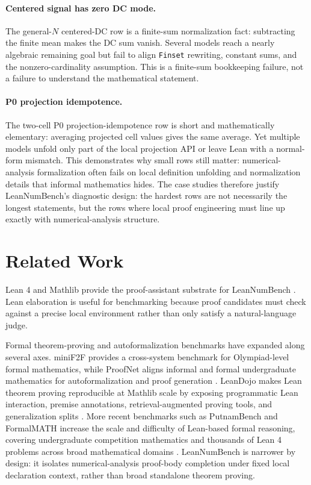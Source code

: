 \documentclass{article}
\begin{document}
\paragraph{Centered signal has zero DC mode.}
The general-$N$ centered-DC row is a finite-sum normalization fact:
subtracting the finite mean makes the DC sum vanish. Several models reach a
nearly algebraic remaining goal but fail to align \texttt{Finset} rewriting,
constant sums, and the nonzero-cardinality assumption. This is a finite-sum
bookkeeping failure, not a failure to understand the mathematical statement.

\paragraph{P0 projection idempotence.}
The two-cell P0 projection-idempotence row is short and mathematically
elementary: averaging projected cell values gives the same average. Yet
multiple models unfold only part of the local projection API or leave Lean
with a normal-form mismatch. This demonstrates why small rows still matter:
numerical-analysis formalization often fails on local definition unfolding and
normalization details that informal mathematics hides. The case studies
therefore justify LeanNumBench's diagnostic design: the hardest rows are not
necessarily the longest statements, but the rows where local proof engineering
must line up exactly with numerical-analysis structure.

\section{Related Work}

Lean 4 and Mathlib provide the proof-assistant substrate for LeanNumBench
\citep{demoura2021lean4,mathlib2020}. Lean elaboration is useful for
benchmarking because proof candidates must check against a precise local
environment rather than only satisfy a natural-language judge.

Formal theorem-proving and autoformalization benchmarks have expanded along
several axes. miniF2F provides a cross-system benchmark for Olympiad-level
formal mathematics, while ProofNet aligns informal and formal undergraduate
mathematics for autoformalization and proof generation
\citep{zheng2022minif2f,azerbayev2023proofnet}. LeanDojo makes Lean theorem
proving reproducible at Mathlib scale by exposing programmatic Lean
interaction, premise annotations, retrieval-augmented proving tools, and
generalization splits \citep{yang2023leandojo}. More recent benchmarks such as
PutnamBench and FormalMATH increase the scale and difficulty of Lean-based
formal reasoning, covering undergraduate competition mathematics and thousands
of Lean 4 problems across broad mathematical domains
\citep{tsoukalas2024putnambench,yu2025formalmath}. LeanNumBench is narrower by
design: it isolates numerical-analysis proof-body completion under fixed local
declaration context, rather than broad standalone theorem proving.
\end{document}
